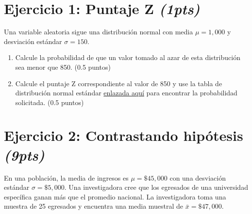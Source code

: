 \documentclass[12pt]{article}
\begin{document}
\begin{enumerate}
\end{enumerate}
\newpage
\section*{Ejercicio 1: Puntaje Z \textit{(1pts)}} 
\noindent
Una variable aleatoria sigue una distribución normal con media  $\mu = 1,000$  y desviación estándar  $\sigma = 150$.
\begin{enumerate}
    \item[a.] Calcule la probabilidad de que un valor tomado al azar de esta distribución sea menor que 850. (0.5 puntos)

    \item[b.] Calcule el puntaje Z correspondiente al valor de 850 y use la tabla de distribución normal estándar \href{https://estadistica-dma.ulpgc.es/estadFCM/pdf/distribuciones.pdf}{ enlazada aquí} para encontrar la probabilidad solicitada. (0.5 puntos)
    \end{enumerate}
\vspace{2em}
\section*{Ejercicio 2: Contrastando hipótesis \textit{(9pts)}} 
\noindent
En una población, la media de ingresos es  $\mu = \$45,000$  con una desviación estándar  $\sigma = \$5,000$. Una investigadora cree que los egresados de una universidad específica ganan más que el promedio nacional. La investigadora toma una muestra de 25 egresados y encuentra una media muestral de  $\bar{x} = \$47,000$.
\end{document}
